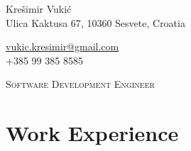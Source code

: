 \documentclass[a4paper,10pt]{article} %
\begin{document}
\pagestyle{empty} %



\begin{minipage}{.5\textwidth}
\LARGE{Krešimir Vukić}\\
\normalsize{Ulica Kaktusa 67, 10360 Sesvete, Croatia}
\end{minipage}%
\begin{minipage}{.5\textwidth}
\raggedleft
\href{mailto:vukic.kresimir@gmail.com}{vukic.kresimir@gmail.com} \\
+385 99 385 8585 \\
\end{minipage}

\vspace{5mm}


\begin{center}
\textsc{\large{Software Development Engineer}}
\end{center}

\vspace{2mm}

\section{Work Experience}
\end{document}
